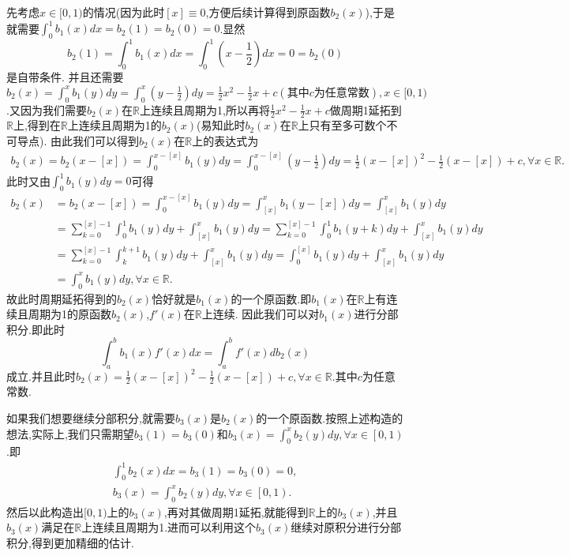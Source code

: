 \documentclass[../../main.tex]{subfiles}
\begin{document}
\begin{remark}
先考虑$x\in [0,1)$的情况(因为此时$[x]\equiv0$,方便后续计算得到原函数$b_2(x)$),于是就需要\(\int_0^1{b_1(x)dx}=b_2\left( 1 \right) =b_2\left( 0 \right) =0\).显然
\[
b_2(1)=\int_{0}^{1}b_1(x)dx=\int_{0}^{1}\left(x-\frac{1}{2}\right)dx = 0 =b_2(0)
\]
是自带条件.
并且还需要\(b_2(x)=\int_0^x{b_1\left( y \right) dy}=\int_0^x{\left( y-\frac{1}{2} \right) dy}=\frac{1}{2}x^2-\frac{1}{2}x + c(\text{其中}c\text{为任意常数}),x\in[0,1)\).又因为我们需要$b_2(x)$在$\mathbb{R}$上连续且周期为1,所以再将$\frac{1}{2}x^2-\frac{1}{2}x + c$做周期1延拓到$\mathbb{R}$上,得到在$\mathbb{R}$上连续且周期为1的$b_2(x)$(易知此时$b_2(x)$在$\mathbb{R}$上只有至多可数个不可导点).
由此我们可以得到$b_2(x)$在$\mathbb{R}$上的表达式为
\begin{align*}
b_2\left( x \right) =b_2\left( x-\left[ x \right] \right) =\int_0^{x-\left[ x \right]}{b_1\left( y \right) dy}=\int_0^{x-\left[ x \right]}{\left( y-\frac{1}{2} \right) dy}=\frac{1}{2}\left( x-\left[ x \right] \right) ^2-\frac{1}{2}\left( x-\left[ x \right] \right) +c,\forall x\in \mathbb{R} .
\end{align*}
此时又由$\int_0^1{b_1\left( y \right) dy}=0$可得
\begin{align*}
b_2\left( x \right) &=b_2\left( x-\left[ x \right] \right) =\int_0^{x-\left[ x \right]}{b_1\left( y \right) dy}=\int_{\left[ x \right]}^x{b_1\left( y-\left[ x \right] \right) dy}=\int_{\left[ x \right]}^x{b_1\left( y \right) dy}
\\
&=\sum_{k=0}^{\left[ x \right] -1}{\int_0^1{b_1\left( y \right) dy}}+\int_{\left[ x \right]}^x{b_1\left( y \right) dy}=\sum_{k=0}^{\left[ x \right] -1}{\int_0^1{b_1\left( y+k \right) dy}}+\int_{\left[ x \right]}^x{b_1\left( y \right) dy}
\\
&=\sum_{k=0}^{\left[ x \right] -1}{\int_k^{k+1}{b_1\left( y \right) dy}}+\int_{\left[ x \right]}^x{b_1\left( y \right) dy}=\int_0^{\left[ x \right]}{b_1\left( y \right) dy}+\int_{\left[ x \right]}^x{b_1\left( y \right) dy}
\\
&=\int_0^x{b_1\left( y \right) dy},\forall x\in \mathbb{R}.
\end{align*}
故此时周期延拓得到的$b_2(x)$恰好就是$b_1(x)$的一个原函数.即$b_1(x)$在$\mathbb{R}$上有连续且周期为1的原函数$b_2(x)$,$f'(x)$在$\mathbb{R}$上连续.
因此我们可以对$b_1(x)$进行分部积分.即此时
\[
\int_{a}^{b}b_1(x)f'(x)dx=\int_{a}^{b}f'(x)db_2(x)
\]
成立.并且此时$ b_2\left( x \right)=\frac{1}{2}\left( x-\left[ x \right] \right) ^2-\frac{1}{2}\left( x-\left[ x \right] \right) +c,\forall x\in \mathbb{R}$.其中$c$为任意常数.

如果我们想要继续分部积分,就需要$b_3(x)$是$b_2(x)$的一个原函数.按照上述构造的想法,实际上,我们只需期望\(b_3(1)=b_3(0)\)和$b_3(x)=\int_0^x{b_2\left( y \right) dy},\forall x\in \left[ 0,1 \right) $.即
\begin{gather*}
\int_{0}^{1}b_2(x)dx =b_3(1)=b_3(0)= 0,
\\
b_3(x)=\int_0^x{b_2\left( y \right) dy},\forall x\in \left[ 0,1 \right).
\end{gather*}
然后以此构造出$[0,1)$上的$b_3(x)$,再对其做周期1延拓,就能得到$\mathbb{R}$上的$b_3(x)$,并且$b_3(x)$满足在$\mathbb{R}$上连续且周期为1.进而可以利用这个$b_3(x)$继续对原积分进行分部积分,得到更加精细的估计.


\end{remark}
\end{document}
